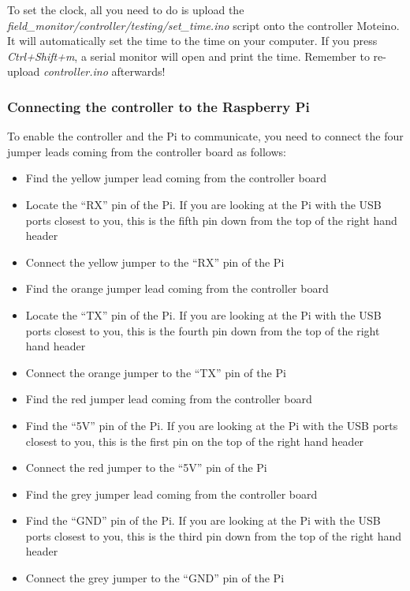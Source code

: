 \documentclass[10pt]{article}
\begin{document}
To set the clock, all you need to do is upload the \textit{field\_monitor/controller/testing/set\_time.ino} script onto the controller Moteino. It will automatically set the time to the time on your computer. If you press \textit{Ctrl+Shift+m}, a serial monitor will open and print the time. Remember to re-upload \textit{controller.ino} afterwards!

\subsubsection{Connecting the controller to the Raspberry Pi}

To enable the controller and the Pi to communicate, you need to connect the four jumper leads coming from the controller board as follows:

\begin{itemize}
 \item Find the yellow jumper lead coming from the controller board
 \item Locate the ``RX'' pin of the Pi. If you are looking at the Pi with the USB ports closest to you, this is the fifth pin down from the top of the right hand header
 \item Connect the yellow jumper to the ``RX'' pin of the Pi
 \item Find the orange jumper lead coming from the controller board
 \item Locate the ``TX'' pin of the Pi. If you are looking at the Pi with the USB ports closest to you, this is the fourth pin down from the top of the right hand header
 \item Connect the orange jumper to the ``TX'' pin of the Pi
 \item Find the red jumper lead coming from the controller board
 \item Find the ``5V'' pin of the Pi. If you are looking at the Pi with the USB ports closest to you, this is the first pin on the top of the right hand header
 \item Connect the red jumper to the ``5V'' pin of the Pi
 \item Find the grey jumper lead coming from the controller board
 \item Find the ``GND'' pin of the Pi. If you are looking at the Pi with the USB ports closest to you, this is the third pin down from the top of the right hand header
 \item Connect the grey jumper to the ``GND'' pin of the Pi
\end{itemize}
\end{document}
